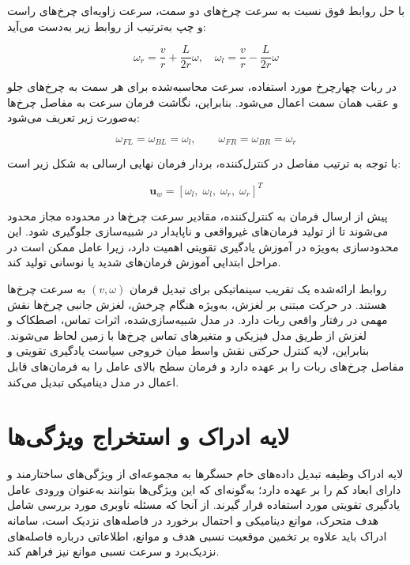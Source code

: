 با حل روابط فوق نسبت به سرعت چرخ‌های دو سمت، سرعت زاویه‌ای چرخ‌های راست و چپ به‌ترتیب از روابط زیر به‌دست می‌آید:

\begin{equation}
	\omega_r = \frac{v}{r} + \frac{L}{2r}\omega,
	\quad
	\omega_l = \frac{v}{r} - \frac{L}{2r}\omega
	\label{eq:wheel_velocities}
\end{equation}

در ربات چهارچرخ مورد استفاده، سرعت محاسبه‌شده برای هر سمت به چرخ‌های جلو و عقب همان سمت اعمال می‌شود. بنابراین، نگاشت فرمان سرعت به مفاصل چرخ‌ها به‌صورت زیر تعریف می‌شود:

\begin{equation}
	\omega_{FL} = \omega_{BL} = \omega_l,
	\qquad
	\omega_{FR} = \omega_{BR} = \omega_r
	\label{eq:four_wheel_velocity_mapping}
\end{equation}

با توجه به ترتیب مفاصل در کنترل‌کننده، بردار فرمان نهایی ارسالی به شکل زیر است:

\begin{equation}
	\mathbf{u}_{w} =
	\left[
	\omega_l,\;
	\omega_l,\;
	\omega_r,\;
	\omega_r
	\right]^T
	\label{eq:wheel_velocity_command_vector}
\end{equation}

پیش از ارسال فرمان به کنترل‌کننده، مقادیر سرعت چرخ‌ها در محدوده مجاز محدود می‌شوند تا از تولید فرمان‌های غیرواقعی و ناپایدار در شبیه‌سازی جلوگیری شود. این محدودسازی به‌ویژه در آموزش یادگیری تقویتی اهمیت دارد، زیرا عامل ممکن است در مراحل ابتدایی آموزش فرمان‌های شدید یا نوسانی تولید کند.

روابط ارائه‌شده یک تقریب سینماتیکی برای تبدیل فرمان \((v,\omega)\) به سرعت چرخ‌ها هستند. در حرکت مبتنی بر لغزش، به‌ویژه هنگام چرخش، لغزش جانبی چرخ‌ها نقش مهمی در رفتار واقعی ربات دارد. در مدل شبیه‌سازی‌شده، اثرات تماس، اصطکاک و لغزش از طریق مدل فیزیکی  و متغیرهای تماس چرخ‌ها با زمین لحاظ می‌شوند. بنابراین، لایه کنترل حرکتی نقش واسط میان خروجی سیاست یادگیری تقویتی و مفاصل چرخ‌های ربات را بر عهده دارد و فرمان سطح بالای عامل را به فرمان‌های قابل اعمال در مدل دینامیکی تبدیل می‌کند.

\section{لایه ادراک و استخراج ویژگی‌ها}
\label{sec:perception_layer}

لایه ادراک وظیفه تبدیل داده‌های خام حسگرها به مجموعه‌ای از ویژگی‌های ساختارمند و دارای ابعاد کم را بر عهده دارد؛ به‌گونه‌ای که این ویژگی‌ها بتوانند به‌عنوان ورودی عامل یادگیری تقویتی مورد استفاده قرار گیرند. از آنجا که مسئله ناوبری مورد بررسی شامل هدف متحرک، موانع دینامیکی و احتمال برخورد در فاصله‌های نزدیک است، سامانه ادراک باید علاوه بر تخمین موقعیت نسبی هدف و موانع، اطلاعاتی درباره فاصله‌های نزدیک‌برد و سرعت نسبی موانع نیز فراهم کند.

